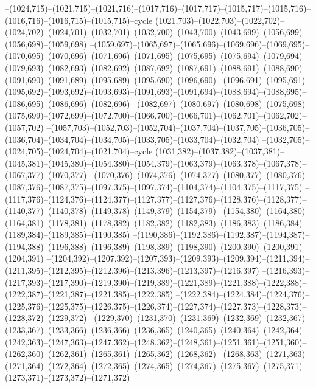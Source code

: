 --(1024,715)--(1021,715)--(1021,716)--(1017,716)--(1017,717)--(1015,717)--(1015,716)--(1016,716)--(1016,715)--(1015,715)--cycle
(1021,703)--(1022,703)--(1022,702)--(1024,702)--(1024,701)--(1032,701)--(1032,700)--(1043,700)--(1043,699)--(1056,699)--(1056,698)--(1059,698)
--(1059,697)--(1065,697)--(1065,696)--(1069,696)--(1069,695)--(1070,695)--(1070,696)--(1071,696)--(1071,695)--(1075,695)--(1075,694)--(1079,694)
--(1079,693)--(1082,693)--(1082,692)--(1087,692)--(1087,691)--(1088,691)--(1088,690)--(1091,690)--(1091,689)--(1095,689)--(1095,690)--(1096,690)
--(1096,691)--(1095,691)--(1095,692)--(1093,692)--(1093,693)--(1091,693)--(1091,694)--(1088,694)--(1088,695)--(1086,695)--(1086,696)--(1082,696)
--(1082,697)--(1080,697)--(1080,698)--(1075,698)--(1075,699)--(1072,699)--(1072,700)--(1066,700)--(1066,701)--(1062,701)--(1062,702)--(1057,702)
--(1057,703)--(1052,703)--(1052,704)--(1037,704)--(1037,705)--(1036,705)--(1036,704)--(1034,704)--(1034,705)--(1033,705)--(1033,704)--(1032,704)
--(1032,705)--(1024,705)--(1024,704)--(1021,704)--cycle
(1031,382)--(1037,382)--(1037,381)--(1045,381)--(1045,380)--(1054,380)--(1054,379)--(1063,379)--(1063,378)--(1067,378)--(1067,377)--(1070,377)
--(1070,376)--(1074,376)--(1074,377)--(1080,377)--(1080,376)--(1087,376)--(1087,375)--(1097,375)--(1097,374)--(1104,374)--(1104,375)--(1117,375)
--(1117,376)--(1124,376)--(1124,377)--(1127,377)--(1127,376)--(1128,376)--(1128,377)--(1140,377)--(1140,378)--(1149,378)--(1149,379)--(1154,379)
--(1154,380)--(1164,380)--(1164,381)--(1178,381)--(1178,382)--(1182,382)--(1182,383)--(1186,383)--(1186,384)--(1189,384)--(1189,385)--(1190,385)
--(1190,386)--(1192,386)--(1192,387)--(1194,387)--(1194,388)--(1196,388)--(1196,389)--(1198,389)--(1198,390)--(1200,390)--(1200,391)--(1204,391)
--(1204,392)--(1207,392)--(1207,393)--(1209,393)--(1209,394)--(1211,394)--(1211,395)--(1212,395)--(1212,396)--(1213,396)--(1213,397)--(1216,397)
--(1216,393)--(1217,393)--(1217,390)--(1219,390)--(1219,389)--(1221,389)--(1221,388)--(1222,388)--(1222,387)--(1221,387)--(1221,385)--(1222,385)
--(1222,384)--(1224,384)--(1224,376)--(1225,376)--(1225,375)--(1226,375)--(1226,374)--(1227,374)--(1227,373)--(1228,373)--(1228,372)--(1229,372)
--(1229,370)--(1231,370)--(1231,369)--(1232,369)--(1232,367)--(1233,367)--(1233,366)--(1236,366)--(1236,365)--(1240,365)--(1240,364)--(1242,364)
--(1242,363)--(1247,363)--(1247,362)--(1248,362)--(1248,361)--(1251,361)--(1251,360)--(1262,360)--(1262,361)--(1265,361)--(1265,362)--(1268,362)
--(1268,363)--(1271,363)--(1271,364)--(1272,364)--(1272,365)--(1274,365)--(1274,367)--(1275,367)--(1275,371)--(1273,371)--(1273,372)--(1271,372)
